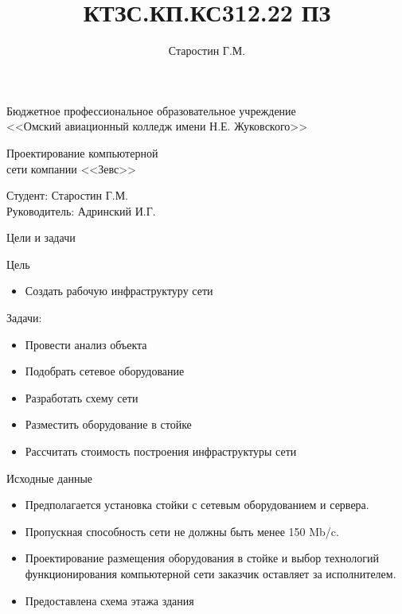 \documentclass[aspectratio=169]{beamer}
\title{КТЗС.КП.КС312.22 ПЗ}
\author{Старостин Г.М.}
\begin{document}
\begin{frame}
	\centering
	 \begin{center}
		Бюджетное профессиональное образовательное учреждение\\
		<<Омский авиационный колледж имени Н.Е. Жуковского>>
	 \end{center}
	 
	 \vspace{1cm}
	 
	 \parbox{0.8\textwidth}{ 
	 	\fontsize{18}{19}\selectfont
	 	\centering
	 	Проектирование компьютерной\\
	 	сети компании <<Зевс>>
	 }
	 \vspace{2cm}
	 \begin{flushleft}
	 	Студент: Старостин Г.М. \\
	 	Руководитель: Адринский И.Г.
	 \end{flushleft}
	 \vspace{0.5cm}
\end{frame}
	
\begin{frame}{Цели и задачи}
	\begin{block}{\large Цель}
		\begin{itemize}
			\item Создать рабочую инфраструктуру сети
		\end{itemize}
	\end{block}
	
	\vspace{0.5cm}
	
	\begin{block}{\large Задачи:}
		\begin{itemize}
			\item Провести анализ объекта
			\item Подобрать сетевое оборудование
			\item Разработать схему сети
			\item Разместить оборудование в стойке
			\item Рассчитать стоимость построения инфраструктуры сети
		\end{itemize}
	\end{block}
	
\end{frame}

\begin{frame}{Исходные данные}
	\begin{itemize}
		\item Предполагается установка стойки с сетевым оборудованием и сервера.
		\item Пропускная способность сети не должны быть менее 150 Mb/c.
		\item Проектирование размещения оборудования в стойке и выбор технологий функционирования компьютерной сети заказчик оставляет за исполнителем.
		\item Предоставлена схема этажа здания
	\end{itemize}
\end{frame}
\end{document}
